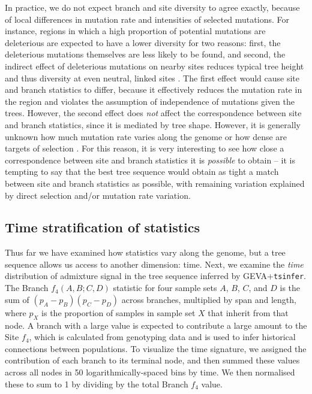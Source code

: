 \documentclass{article}
\newcommand{\tsinfer}{{\texttt{tsinfer}}}
\begin{document}
In practice, we do not expect branch and site diversity to agree exactly,
because of local differences in mutation rate and intensities of selected mutations.
For instance, regions in which a high proportion of potential mutations are deleterious
are expected to have a lower diversity for two reasons:
first, the deleterious mutations themselves are less likely to be found,
and second, the indirect effect of deleterious mutations on nearby sites reduces typical tree height
and thus diversity at even neutral, linked sites \citep{hudson1994levels,charlesworth1997effects}.
The first effect would cause site and branch statistics to differ,
because it effectively reduces the mutation rate in the region
and violates the assumption of independence of mutations given the trees.
However, the second effect does \emph{not} affect the correspondence between site and branch statistics,
since it is mediated by tree shape.
However, it is generally unknown how much mutation rate varies along the genome
\citep[but see][]{supek2015differential}
or how dense are targets of selection \citep{leffler2012revisiting}.
For this reason, it is very interesting to see how close a correspondence between site and branch
statistics it is \emph{possible} to obtain --
it is tempting to say that the best tree sequence would obtain
as tight a match between site and branch statistics as possible,
with remaining variation explained by direct selection and/or mutation rate variation.


\subsection*{Time stratification of statistics}

Thus far we have examined how statistics vary along the genome,
but a tree sequence allows us access to another dimension: time.
Next, we examine the \emph{time} distribution of admixture signal
in the tree sequence inferred by GEVA+\tsinfer.
The Branch $f_4(A, B; C, D)$ statistic for four sample sets $A$, $B$, $C$, and $D$
is the sum of $(p_A - p_B)(p_C - p_D)$ across branches, multiplied by span and length,
where $p_X$ is the proportion of samples in sample set $X$ that inherit from that node.
A branch with a large value is expected to contribute a large amount to the Site $f_4$,
which is calculated from genotyping data
and is used to infer historical connections between populations.
To visualize the time signature, we assigned the contribution of each branch
to its terminal node,
and then summed these values across all nodes in 50 logarithmically-spaced bins by time.
We then normalised these to sum to 1 by dividing by the total Branch $f_4$ value.
\end{document}
